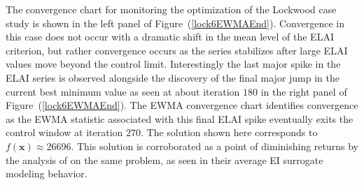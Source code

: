 \documentclass{article}
\begin{document}

%
%

%
The convergence chart for monitoring the optimization of the Lockwood case 
study is shown in the left panel of Figure~(\ref{lock6EWMAEnd}). Convergence 
in this case does not occur with a dramatic shift in the mean level of the 
ELAI criterion, but rather convergence occurs as the series stabilizes after 
large ELAI values move beyond the control limit. Interestingly the last major 
spike in the ELAI series is observed alongside the discovery of the final 
major jump in the current best minimum value as seen at about iteration $180$ 
in the right panel of Figure~(\ref{lock6EWMAEnd}). The EWMA convergence chart 
identifies convergence as the EWMA statistic associated with this final ELAI 
spike eventually exits the control window at iteration $270$. The solution 
shown here corresponds to $f(\bm{x})\approx26696$. This solution is 
corroborated as a point of diminishing returns by the analysis of 
\cite{gramacy2014} on the same problem, as seen in their average EI surrogate 
modeling behavior. 


\end{document}
